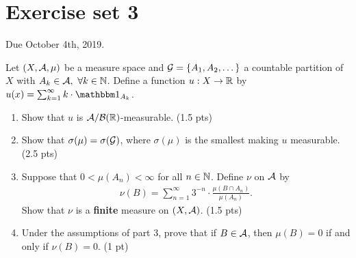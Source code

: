 \section{Exercise set 3}

Due October 4th, 2019.

\begin{ex}
	Let $(X, \mathcal{A}, \mu)$ be a measure space and $\mathcal{G}=\{A_1, A_2, \dots\}$ a countable partition of $X$ with $A_k \in \mathcal{A},\ \forall k \in \mathbb{N}$. Define a function $u : X \to \mathbb{R}$ by $u(x) = \sum_{k = 1}^{\infty} k \cdot \ind_{A_k}$.
	
	\begin{enumerate}
		\item Show that $u$ is $\mathcal{A}/\mathcal{B}(\mathbb{R})$-measurable. (1.5 pts)
		\item Show that $\sigma(\mu) = \sigma(\mathcal{G})$, where $\sigma(\mu)$ is the smallest \siga making $u$ measurable. (2.5 pts)
		\item Suppose that $0 < \mu(A_n) < \infty$ for all $n \in \mathbb{N}$. Define $\nu$ on $\mathcal{A}$ by
		\begin{align*}
		\nu(B) = \sum_{n = 1}^{\infty} 3^{-n} \cdot \frac{\mu(B \cap A_n)}{\mu (A_n)}.
		\end{align*}
		Show that $\nu$ is a \textbf{finite} measure on $(X, \mathcal{A})$. (1.5 pts)
		
		\item Under the assumptions of part 3, prove that if $B \in \mathcal{A}$, then $\mu(B) = 0$ if and only if $\nu(B) = 0$. (1 pt)
	\end{enumerate}
\end{ex}

